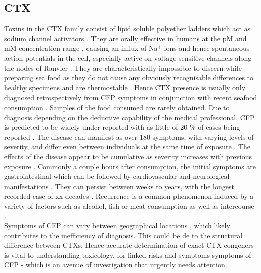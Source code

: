 \subsection{CTX}
Toxins in the CTX family consist of lipid soluble polyether ladders which act as sodium channel activators \cite{dechraoui1999ciguatoxins}. They are orally effective in humans at the pM and mM concentration range \cite{molgo2000ciguatera}, causing an influx of Na$^{+}$ ions and hence spontaneous action potentials in the cell, especially active on voltage sensitive channels along the nodes of Ranvier \cite{sims1987theoretical,mattei1999neurotoxins,lewis1992action,molgo2000ciguatera}. They are characteristically impossible to discern while preparing sea food as they do not cause any obviously recognisable differences to healthy specimens and are thermostable \cite{withers1982ciguatera}. Hence CTX presence is usually only diagnosed retrospectively from CFP symptoms in conjunction with recent seafood consumption \cite{sims1987theoretical}. Samples of the food consumed are rarely obtained. Due to diagnosis depending on the deductive capability of the medical professional, CFP is predicted to be widely under reported with as little of 20 \% of cases being reported \cite{}. The disease can manifest as over 180 symptoms, with varying levels of severity, and differ even between individuals at the same time of exposure \cite{sims1987theoretical}. The effects of the disease appear to be cumulative as severity increases with previous exposure \cite{}. Commonly a couple hours after consumption, the initial symptoms are gastrointestinal which can be followed by cardiovascular and neurological manifestations \cite{sims1987theoretical}. They can persist between weeks to years, with the longest recorded case of xx decades \cite{}. Recurrence is a common phenomenon induced by a variety of factors such as alcohol, fish or meat consumption as well as intercourse \cite{}. \\
Symptoms of CFP can vary between geographical locations \cite{molgo2000ciguatera,dickey2010ciguatera}, which likely contributes to the inefficiency of diagnosis. This could be de to the structural difference between CTXs. Hence accurate determination of exact CTX congeners is vital to understanding toxicology, for linked risks and symptoms symptoms of CFP - which is an avenue of investigation that urgently needs attention.\\

